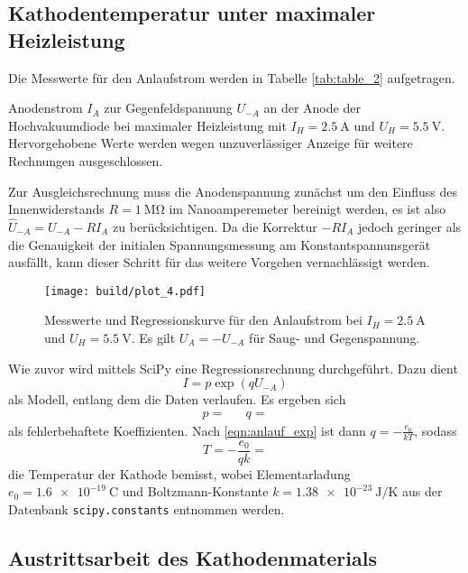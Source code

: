 \newpage
\subsection{Kathodentemperatur unter maximaler Heizleistung}

Die Messwerte für den Anlaufstrom werden in Tabelle \ref{tab:table_2} aufgetragen. 

\begin{table}[H]
	\caption{Anodenstrom $I_A$ zur Gegenfeldspannung $U_{-A}$ an der Anode der Hochvakuumdiode bei maximaler Heizleistung mit
			 $I_H = \qty{2.5}{\ampere}$ und $U_H = \qty{5.5}{\volt}$. Hervorgehobene Werte werden wegen unzuverlässiger Anzeige
			 für weitere Rechnungen ausgeschlossen.}
	\centering
	
	\label{tab:table_2}
\end{table}

Zur Ausgleichsrechnung muss die Anodenspannung zunächst um den Einfluss des Innenwiderstands $R = \qty{1}{\mega\ohm}$ im
Nanoamperemeter bereinigt werden, es ist also $\hat U_{-A} = U_{-A} - RI_A$ zu berücksichtigen. Da die Korrektur $-RI_A$ jedoch
geringer als die Genauigkeit der initialen Spannungsmessung am Konstantspannunsgerät ausfällt, kann dieser Schritt für das weitere
Vorgehen vernachlässigt werden.

\begin{figure}[H]
	\texttt{[image: build/plot\_4.pdf]}
	\caption{Messwerte und Regressionskurve für den Anlaufstrom bei $I_H = \qty{2.5}{\ampere}$ und $U_H = \qty{5.5}{\volt}$. Es gilt
			 $U_A = -U_{-A}$ für Saug- und Gegenspannung.}
	\label{fig:plot_4}
\end{figure}

Wie zuvor wird mittels SciPy \cite{scipy} eine Regressionsrechnung durchgeführt. Dazu dient
\begin{equation*}
	I = p \exp(q U_{-A})
\end{equation*}
als Modell, entlang dem die Daten verlaufen. Es ergeben sich
\begin{align*}
	p =  && q = 
\end{align*}
als fehlerbehaftete Koeffizienten. Nach \eqref{eqn:anlauf_exp} ist dann $q = -\frac{e_0}{kT}$, sodass
\begin{equation*}
	T = -\frac{e_0}{qk} = 
\end{equation*}
die Temperatur der Kathode bemisst, wobei Elementarladung $e_0 = \qty{1.6e-19}{\coulomb}$ und Boltzmann-Konstante
$k = \qty{1.38e-23}{\joule\per\kelvin}$ aus der Datenbank \verb+scipy.constants+ entnommen werden.

\subsection{Austrittsarbeit des Kathodenmaterials}

